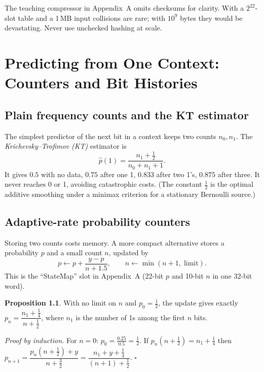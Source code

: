 \documentclass[11pt,a4paper,openany]{book}
\theoremstyle{definition}
\newtheorem{proposition}[theorem]{Proposition}
\theoremstyle{remark}
\begin{document}
\begin{pitfall}
The teaching compressor in Appendix~A omits checksums for clarity. With a $2^{22}$-slot table and a 1\,MB input collisions are rare; with $10^9$ bytes they would be devastating. Never use unchecked hashing at scale.
\end{pitfall}

\chapter{Predicting from One Context: Counters and Bit Histories}

\section{Plain frequency counts and the KT estimator}

The simplest predictor of the next bit in a context keeps two counts $n_0,n_1$. The \emph{Krichevsky--Trofimov (KT)} estimator is
\[
\hat p(1)=\frac{n_1+\tfrac12}{n_0+n_1+1}.
\]
It gives $0.5$ with no data, $0.75$ after one 1, $0.833$ after two 1's, $0.875$ after three. It never reaches 0 or 1, avoiding catastrophic costs. (The constant $\frac12$ is the optimal additive smoothing under a minimax criterion for a stationary Bernoulli source.)

\section{Adaptive-rate probability counters}

Storing two counts costs memory. A more compact alternative stores a probability $p$ and a small count $n$, updated by
\[
p\leftarrow p+\frac{y-p}{n+1.5},\qquad n\leftarrow\min(n+1,\;\text{limit}).
\]
This is the ``StateMap'' slot in Appendix~A (22-bit $p$ and 10-bit $n$ in one 32-bit word).

\begin{proposition}
With no limit on $n$ and $p_0=\frac12$, the update gives exactly $p_n=\dfrac{n_1+\frac14}{n+\frac12}$, where $n_1$ is the number of 1s among the first $n$ bits.
\end{proposition}
\emph{Proof by induction.} For $n=0$: $p_0=\frac{0.25}{0.5}=\frac12$. If $p_n(n+\frac12)=n_1+\frac14$ then $p_{n+1}=\dfrac{p_n(n+\frac12)+y}{n+\frac32}=\dfrac{n_1+y+\frac14}{(n+1)+\frac12}$. $\square$
\end{document}
